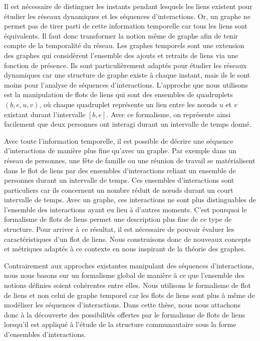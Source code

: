 Il est nécessaire de distinguer les instants pendant lesquels les liens existent pour étudier les réseaux dynamiques et les séquences d'interactions.
Or, un graphe ne permet pas de tirer parti de cette information temporelle car tous les liens sont équivalents. 
Il faut donc transformer la notion même de graphe afin de tenir compte de la temporalité du réseau.
Les graphes temporels sont une extension des graphes qui considèrent l'ensemble des ajouts et retraits de liens via une fonction de présence.
Ils sont particulièrement adaptés pour étudier les réseaux dynamiques car une structure de graphe existe à chaque instant, mais ils le sont moins pour l'analyse de séquences d'interactions.
L'approche que nous utilisons est la manipulation de flots de liens qui sont des ensembles de quadruplets $(b, e, u, v)$, où chaque quadruplet représente un lien entre les n\oe{}uds $u$ et $v$ existant durant l'intervalle $[b,e]$.
Avec ce formalisme, on représente ainsi facilement que deux personnes ont interagi durant un intervalle de temps donné.


Avec toute l'information temporelle, il est possible de décrire une séquence d'interactions de manière plus fine qu'avec un graphe.
Par exemple dans un réseau de personnes, une fête de famille ou une réunion de travail se matérialisent dans le flot de liens par des ensembles d'interactions reliant un ensemble de personnes durant un intervalle de temps.
Ces ensembles d'interactions sont particuliers car ils concernent un nombre réduit de n\oe{}uds durant un court intervalle de temps.
Avec un graphe, ces interactions ne sont plus distinguables de l'ensemble des interactions ayant eu lieu à d'autres moments.
C'est pourquoi le formalisme de flots de liens permet une description plus fine de ce type de structure.
Pour arriver à ce résultat, il est nécessaire de pouvoir évaluer les caractéristiques d'un flot de liens.
Nous construisons donc de nouveaux concepts et métriques adaptés à ce contexte en nous inspirant de la théorie des graphes.


\bigskip


Contrairement aux approches existantes manipulant des séquences d'interactions, nous nous basons sur un formalisme global de manière à ce que l'ensemble des notions définies soient cohérentes entre elles.
Nous utilisons le formalisme de flot de liens et non celui de graphe temporel car les flots de liens sont plus à même de modéliser les séquences d'interactions.
Dans cette thèse, nous nous attachons donc à la découverte des possibilités offertes par le formalisme de flots de liens lorsqu'il est appliqué à l'étude de la structure communautaire sous la forme d'ensembles d'interactions.

